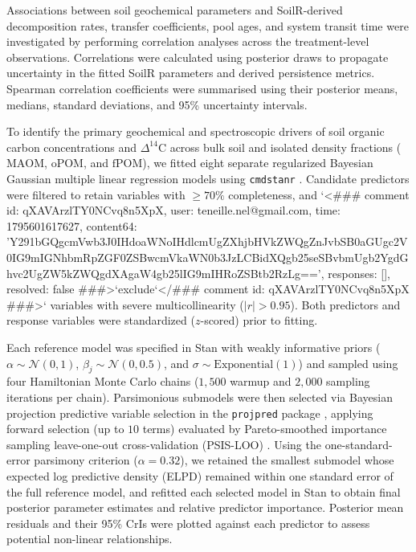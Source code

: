\documentclass[preprint,12pt]{elsarticle}
\begin{document}
Associations between soil geochemical parameters and SoilR-derived decomposition rates, transfer coefficients, pool ages, and system transit time were investigated by performing correlation analyses across the treatment-level observations. Correlations were calculated using posterior draws to propagate uncertainty in the fitted SoilR parameters and derived persistence metrics. Spearman correlation coefficients were summarised using their posterior means, medians, standard deviations, and 95\% uncertainty intervals. 

To identify the primary geochemical and spectroscopic drivers of soil organic carbon concentrations and $\Delta^{14}\text{C}$ across bulk soil and isolated density fractions ($\text{MAOM}$, $\text{oPOM}$, and $\text{fPOM}$), we fitted eight separate regularized Bayesian Gaussian multiple linear regression models using \texttt{cmdstanr} \citep{Carpenter2017, Gabry2025}. Candidate predictors were filtered to retain variables with $\ge 70\%$ completeness, and `<### comment id: qXAVArzlTY0NCvq8n5XpX, user: teneille.nel@gmail.com, time: 1795601617627, content64: 'Y291bGQgcmVwb3J0IHdoaWNoIHdlcmUgZXhjbHVkZWQgZnJvbSB0aGUgc2V0IG9mIGNhbmRpZGF0ZSBwcmVkaWN0b3JzLCBidXQgb25seSBvbmUgb2YgdGhvc2UgZW5kZWQgdXAgaW4gb25lIG9mIHRoZSBtb2RzLg==', responses: [], resolved: false ###>`exclude`</### comment id: qXAVArzlTY0NCvq8n5XpX ###>` variables with severe multicollinearity ($|r| > 0.95$). Both predictors and response variables were standardized ($z$-scored) prior to fitting.

Each reference model was specified in Stan with weakly informative priors ($\alpha \sim \mathcal{N}(0, 1)$, $\beta_j \sim \mathcal{N}(0, 0.5)$, and $\sigma \sim \text{Exponential}(1)$) and sampled using four Hamiltonian Monte Carlo chains ($1{,}500$ warmup and $2{,}000$ sampling iterations per chain). Parsimonious submodels were then selected via Bayesian projection predictive variable selection in the \texttt{projpred} package \citep{Piironen2020, Catalina2022}, applying forward selection (up to $10$ terms) evaluated by Pareto-smoothed importance sampling leave-one-out cross-validation (PSIS-LOO) \citep{Vehtari2017}. Using the one-standard-error parsimony criterion ($\alpha = 0.32$), we retained the smallest submodel whose expected log predictive density (ELPD) remained within one standard error of the full reference model, and refitted each selected model in Stan to obtain final posterior parameter estimates and relative predictor importance. Posterior mean residuals and their 95\% CrIs were plotted against each predictor to assess potential non-linear relationships.
\end{document}

